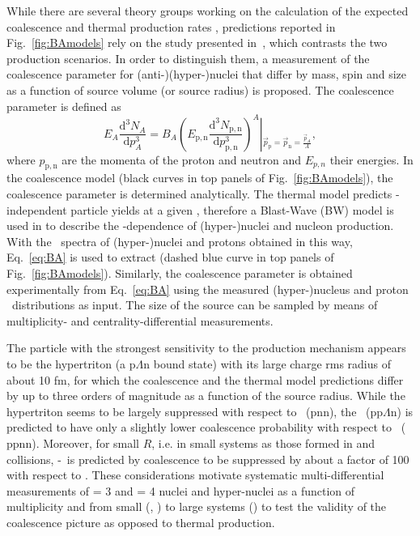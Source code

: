 While there are several theory groups working on the calculation of the expected coalescence \cite{Scheibl:1998tk, Cho:2017dcy, Zhang:2018euf, Bazak:2018hgl, Zhao:2018lyf} and thermal production rates \cite{Andronic:2010qu, Wheaton:2004qb, Petran:2013dva}, predictions reported in Fig.~\ref{fig:BAmodels} rely on the study presented in~\cite{Bellini:2018epz}, which contrasts the two production scenarios. 
In order to distinguish them, a measurement of the coalescence parameter for (anti-)(hyper-)nuclei that differ by mass, spin and size 
as a function of source volume (or source radius) is proposed. 
%
The coalescence parameter \BA is defined as 
%
\begin{equation}
E_{A}\frac{\mathrm{d}^{3}N_{A}}{\mathrm{d}p_{A}^{3}}=B_{A}{\left(E_{\mathrm{p,n}}\frac{\mathrm{d}^{3}N_{\mathrm{p,n}}}{\mathrm{d}p_{\mathrm{p,n}}^{3}}\right)^{A}}\left\vert_{\vec{p}_{\mathrm{p}}=\vec{p}_{\mathrm{n}}=\frac{\vec{p}_{A}}{A}} \right.,
\label{eq:BA}
\end{equation}
%
\noindent where $p_{\mathrm{p,n}}$ are the momenta of the proton and neutron and $E_{p,n}$ their energies. In the coalescence model (black curves in top panels of Fig.~\ref{fig:BAmodels}), the coalescence parameter is determined analytically. The thermal model predicts \pT-independent particle yields at a given \Tchem, therefore a Blast-Wave (BW) model is used in \cite{Bellini:2018epz} to describe the \pT-dependence of (hyper-)nuclei and nucleon production. With the \pT~spectra of (hyper-)nuclei and protons obtained in this way, Eq.~\ref{eq:BA} is used to extract \BA (dashed blue curve in top panels of Fig.~\ref{fig:BAmodels}). 
Similarly, the coalescence parameter is obtained experimentally from Eq.~\ref{eq:BA} using the measured (hyper-)nucleus and proton \pT~distributions as input.
%
The size of the source can be sampled by means of multiplicity- and centrality-differential measurements.
%

The particle with the strongest sensitivity to the production mechanism appears to be the hypertriton (a p$\Lambda$n bound state) with its large charge rms radius of about 10 fm, for which the coalescence and the thermal model predictions differ by up to three orders of magnitude as a function of the source radius. 
While the hypertriton seems to be largely suppressed with respect to \hethree~($\mathrm{pnn}$), the \hypfour\ ($\mathrm{pp}\Lambda\mathrm{n}$) is predicted to have only a slightly lower coalescence probability with respect to \hefour~($\mathrm{ppnn}$). 
Moreover, for small $R$, i.e. in small systems as those formed in \pp and \pPb collisions, \hyp~is predicted by coalescence to be suppressed by about a factor of 100 with respect to \hethree. 
These considerations motivate systematic multi-differential measurements of \Anucl = 3 and \Anucl = 4 nuclei and hyper-nuclei as a function of multiplicity and from small (\pp, \pPb) to large systems (\PbPb) to test the validity of the coalescence picture as opposed to thermal production.


